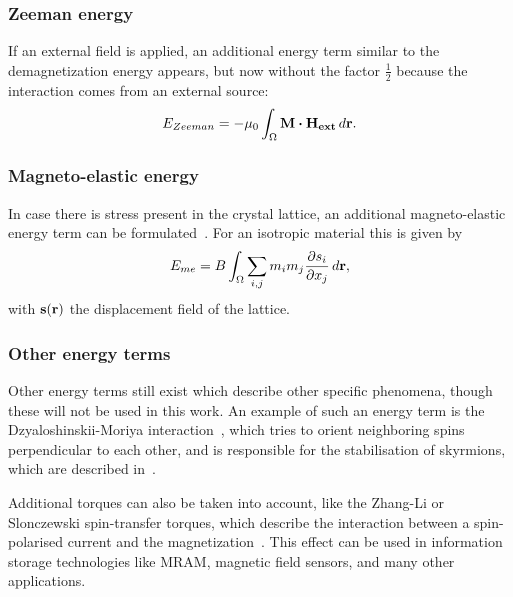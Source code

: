 \documentclass[10pt,a4paper]{article}
\begin{document}
\subsubsection{Zeeman energy}
If an external field is applied, an additional energy term similar to the demagnetization energy appears, but now without the factor $\frac{1}{2}$ because the interaction comes from an external source:
\begin{equation}
    E_{Zeeman} = -\mu_0 \int_\Omega \vb{M} \vdot \vb{H_{ext}} \, d\vb{r} \mathrm{.} \label{eq:Energy_Term_Zeeman}
\end{equation}

\subsubsection{Magneto-elastic energy}
\label{par:Energy_MagnetoElastic}
In case there is stress present in the crystal lattice, an additional magneto-elastic energy term can be formulated~\cite{Gilbert1956}. For an isotropic material this is given by
\begin{equation}
    E_{me} = B \int_\Omega \sum_{i,j} m_i m_j \frac{\partial s_i}{\partial x_j} \,d\vb{r} \mathrm{,}
\end{equation}
with $\vb{s}(\vb{r})$ the displacement field of the lattice.

\subsubsection{Other energy terms}
Other energy terms still exist which describe other specific phenomena, though these will not be used in this work. An example of such an energy term is the Dzyaloshinskii-Moriya interaction~\cite{DzyaloshinskiiMoriya}, which tries to orient neighboring spins perpendicular to each other, and is responsible for the stabilisation of skyrmions, which are described in~\cite{skyrmions}. \par Additional torques can also be taken into account, like the Zhang-Li or Slonczewski spin-transfer torques, which describe the interaction between a spin-polarised current and the magnetization~\cite{ZhangLiSpinTransferTorque, MuMax3, syllabus_PoAEaPD}. This effect can be used in information storage technologies like MRAM, magnetic field sensors, and many other applications.~\cite{syllabus_PoAEaPD}
\end{document}
